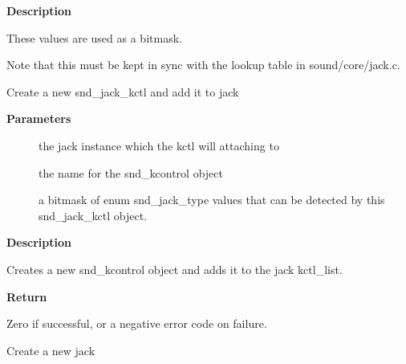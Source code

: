 \documentclass[a4paper,8pt,english]{sphinxmanual}
\begin{document}
\textbf{Description}

These values are used as a bitmask.

Note that this must be kept in sync with the lookup table in
sound/core/jack.c.

\begin{fulllineitems}
\label{sound/kernel-api/alsa-driver-api:c.snd_jack_add_new_kctl}
Create a new snd\_jack\_kctl and add it to jack

\end{fulllineitems}


\textbf{Parameters}
\begin{description}
\item[{}] \leavevmode
the jack instance which the kctl will attaching to

\item[{}] \leavevmode
the name for the snd\_kcontrol object

\item[{}] \leavevmode
a bitmask of enum snd\_jack\_type values that can be detected
by this snd\_jack\_kctl object.

\end{description}

\textbf{Description}

Creates a new snd\_kcontrol object and adds it to the jack kctl\_list.

\textbf{Return}

Zero if successful, or a negative error code on failure.

\begin{fulllineitems}
\label{sound/kernel-api/alsa-driver-api:c.snd_jack_new}
Create a new jack

\end{fulllineitems}
\end{document}
